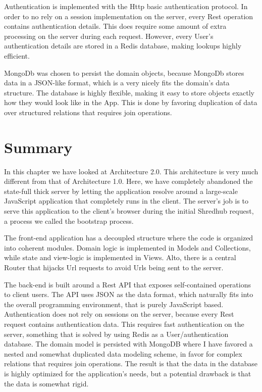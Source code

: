 Authentication is implemented with the Http basic authentication protocol. In order to no rely on a session implementation on the server, every Rest operation contains authentication details. This does require some amount of extra processing on the server during each request. However, every User's authentication details are stored in a Redis database, making lookups highly efficient. 

MongoDb was chosen to persist the domain objects, because MongoDb stores data in a JSON-like format, which is a very nicely fits the domain's data structure. The database is highly flexible, making it easy to store objects exactly how they would look like in the App. This is done by favoring duplication of data over structured relations that requires join operations. 
 
 \section{Summary}
 In this chapter we have looked at Architecture 2.0. This architecture is very much different from that of Architecture 1.0. Here, we have completely abandoned the state-full thick server by letting the application resolve around a large-scale JavaScript application that completely runs in the client. The server's job is to serve this application to the client's browser during the initial Shredhub request, a process we called the bootstrap process. 
 
 The front-end application has a decoupled structure where the code is organized into coherent modules. Domain logic is implemented in Models and Collections, while state and view-logic is implemented in Views. Alto, there is a central Router that hijacks Url requests to avoid Urls being sent to the server. 
 
The back-end is built around a Rest API that exposes self-contained operations to client users. The API uses JSON as the data format, which naturally fits into the overall programming environment, that is purely JavaScript based. Authentication does not rely on sessions on the server, because every Rest request contains authentication data. This requires fast authentication on the server, something that is solved by using Redis as a User/authentication database. The domain model is persisted with MongoDB where I have favored a nested and somewhat duplicated data modeling scheme, in favor for complex relations that requires join operations. The result is that the data in the database is highly optimized for the application's needs, but a potential drawback is that the data is somewhat rigid.


